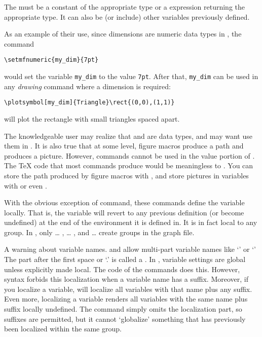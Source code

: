\documentclass[letterpaper]{article}
\begin{document}
The  must be a constant of the appropriate type or a \MF{}
expression returning the appropriate type. It can also be (or include)
other variables previously defined.

As an example of their use, since dimensions are numeric data types in
\MF{}, the command
\begin{verbatim}
\setmfnumeric{my_dim}{7pt}
\end{verbatim}
would set the \MF{} variable \verb$my_dim$ to the value \texttt{7pt}.
After that, \verb$my_dim$ can be used in any \emph{drawing} command
where a dimension is required:
\begin{verbatim}
\plotsymbol[my_dim]{Triangle}\rect{(0,0),(1,1)}
\end{verbatim}
will plot the rectangle with small triangles spaced \dim{7pt} apart.

The knowledgeable user may realize that  and  are
\MF{} data types, and may want use them in . It is
also true that at some level, \mfp{} figure macros produce a path and
 produces a picture. However, \mfp{} commands cannot be
used in the value portion of . The \TeX{} code that
most \mfp{} commands produce would be meaningless to \MF{}. You can
store the path produced by figure macros with , and store
pictures in variables with  or even .

With the obvious exception of  command, these
commands define the variable locally. That is, the variable will revert
to any previous definition (or become undefined) at the end of the
 environment it is defined in. It is in fact local to any
\MF{} group. In \mfp{}, only  {\dots} ,
 {\dots} , and  {\dots}
 create \MF{} groups in the graph file.

A warning about variable names. \CMF{} and \MP{} allow multi-part
variable names like `' or `' The part
after the first space or `.' is called a . In \MF{},
variable settings are global unless explicitly made local. The code of
the  commands does this. However, \MF{} syntax forbids this
localization when a variable name has a suffix. Moreover, if you
localize a variable, \MF{} will localize all variables with that name
plus any suffix. Even more, localizing a variable renders all variables
with the same name plus suffix locally undefined. The command
 simply omits the localization part, so suffixes
are permitted, but it cannot `globalize' something that has previously
been localized within the same group.
\end{document}
